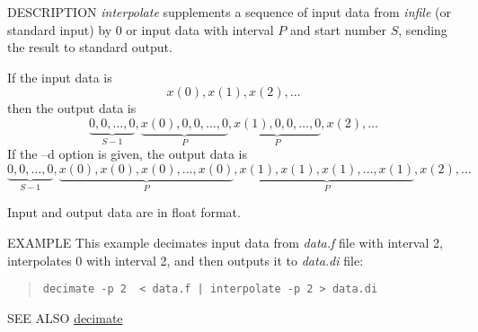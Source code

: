 \begin{synopsis}
\item[interpolate] [ --p $P$ ] [ --s $S$ ] [ --d ] [ {\em infile} ]
\end{synopsis}

\begin{qsection}{DESCRIPTION}
{\em interpolate} supplements a sequence of input data
from {\em infile} (or standard input)
by 0 or input data with interval $P$ and start number $S$,
sending the result to standard output.

If the input data is
\begin{displaymath}
 x(0), x(1), x(2), \dots
\end{displaymath}
then the output data is
\begin{displaymath}
\underbrace{0, 0, \dots, 0}_{S-1},\underbrace{x(0), 0, 0, \dots, 0}_{P},\underbrace{x(1), 0, 0, \dots, 0}_{P},x(2), \dots
\end{displaymath}
If the --d option is given, the output data is
\begin{displaymath}
\underbrace{0, 0, \dots, 0}_{S-1},\underbrace{x(0), x(0), x(0), \dots, x(0)}_{P},\underbrace{x(1), x(1), x(1), \dots, x(1)}_{P},x(2), \dots
\end{displaymath}
\par
Input and output data are in float format.
\end{qsection}

\begin{options}
\end{options}

\begin{qsection}{EXAMPLE}
This example decimates input data from {\em data.f} file with interval 2,
interpolates 0 with interval 2, and then outputs it to {\em
data.di} file:
\begin{quote}
  \verb!decimate -p 2  < data.f | interpolate -p 2 > data.di!
\end{quote}
\end{qsection}

\begin{qsection}{SEE ALSO}
\hyperlink{decimate}{decimate}
\end{qsection}
